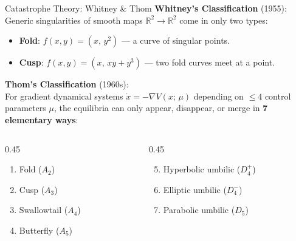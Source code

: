 \begin{frame}{Catastrophe Theory: Whitney \& Thom}
\textbf{Whitney's Classification} (1955): \\
Generic singularities of smooth maps $\mathbb{R}^2 \to \mathbb{R}^2$ come in only two types:
\begin{itemize}
    \item \textbf{Fold}: $f(x,y) = (x,\, y^2)$ --- a curve of singular points.
    \item \textbf{Cusp}: $f(x,y) = (x,\, xy + y^3)$ --- two fold curves meet at a point.
\end{itemize}

\vspace{0.3cm}
\textbf{Thom's Classification} (1960s): \\
For gradient dynamical systems $\dot{x} = -\nabla V(x;\, \mu)$ depending on $\leq 4$ control parameters $\mu$, the equilibria can only appear, disappear, or merge in \textbf{7 elementary ways}:

\vspace{0.2cm}
\begin{columns}[T]
\begin{column}{0.45\textwidth}
\begin{enumerate}
    \item Fold ($A_2$)
    \item Cusp ($A_3$)
    \item Swallowtail ($A_4$)
    \item Butterfly ($A_5$)
\end{enumerate}
\end{column}
\begin{column}{0.45\textwidth}
\begin{enumerate}
    \setcounter{enumi}{4}
    \item Hyperbolic umbilic ($D_4^+$)
    \item Elliptic umbilic ($D_4^-$)
    \item Parabolic umbilic ($D_5$)
\end{enumerate}
\end{column}
\end{columns}
\end{frame}


